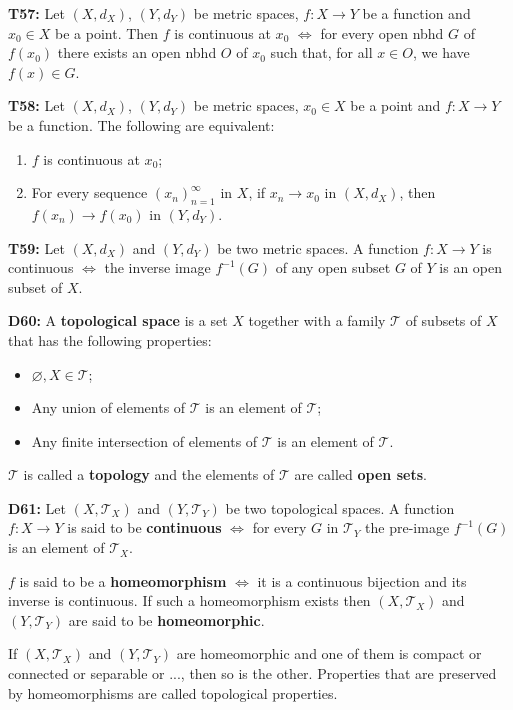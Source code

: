 \documentclass[twocolumn,10pt]{article}
\begin{document}
\textbf{T57:} Let $(X,d_X)$, $(Y,d_Y)$ be metric spaces, $f:X\to Y$ be a function and $x_0\in X$ be a point. Then $f$ is continuous at $x_0$ $\Leftrightarrow$ for every open nbhd $G$ of $f(x_0)$ there exists an open nbhd $O$ of $x_0$ such that, for all $x\in O$, we have $f(x)\in G$.

\textbf{T58:} Let $(X,d_X)$, $(Y,d_Y)$ be metric spaces, $x_0\in X$ be a point and $f:X\to Y$ be a function. The following are equivalent:
\begin{enumerate}
    \item $f$ is continuous at $x_0$;
    \item For every sequence $(x_n)_{n=1}^{\infty}$ in $X$, if $x_n\to x_0$ in $(X,d_X)$, then $f(x_n)\to f(x_0)$ in $(Y,d_Y)$.
\end{enumerate}
\textbf{T59:} Let $(X,d_X)$ and $(Y,d_Y)$ be two metric spaces. A function $f:X\to Y$ is continuous $\Leftrightarrow$ the inverse image $f^{-1}(G)$ of any open subset $G$ of $Y$ is an open subset of $X$.

\textbf{D60:} A \textbf{topological space} is a set $X$ together with a family $\mathcal{T}$ of subsets of $X$ that has the following properties:
\begin{itemize}
    \item $\varnothing,X\in\mathcal{T}$;
    \item Any union of elements of $\mathcal{T}$ is an element of $\mathcal{T}$;
    \item Any finite intersection of elements of $\mathcal{T}$ is an element of $\mathcal{T}$.
\end{itemize}
$\mathcal{T}$ is called a \textbf{topology} and the elements of $\mathcal{T}$ are called \textbf{open sets}.

\textbf{D61:} Let $(X,\mathcal{T}_X)$ and $(Y,\mathcal{T}_Y)$ be two topological spaces. A function $f:X\to Y$ is said to be \textbf{continuous} $\Leftrightarrow$ for every $G$ in $\mathcal{T}_Y$ the pre-image $f^{-1}(G)$ is an element of $\mathcal{T}_X$.

$f$ is said to be a \textbf{homeomorphism} $\Leftrightarrow$ it is a continuous bijection and its inverse is continuous. If such a homeomorphism exists then $(X,\mathcal{T}_X)$ and $(Y,\mathcal{T}_Y)$ are said to be \textbf{homeomorphic}.

If $(X,\mathcal{T}_X)$ and $(Y,\mathcal{T}_Y)$ are homeomorphic and one of them is compact or connected or separable or ..., then so is the other. Properties that are preserved by homeomorphisms are called topological properties.
\end{document}
